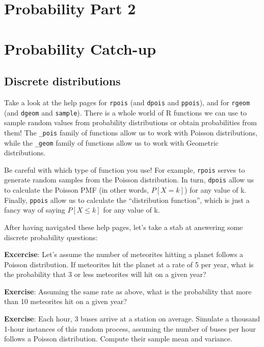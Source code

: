 \documentclass[
]{book}
\begin{document}
\hypertarget{probability-part-2}{%
\chapter{Probability Part 2}\label{probability-part-2}}

\hypertarget{probability-catch-up}{%
\chapter{Probability Catch-up}\label{probability-catch-up}}

\hypertarget{discrete-distributions}{%
\section{Discrete distributions}\label{discrete-distributions}}

Take a look at the help pages for \texttt{rpois} (and \texttt{dpois} and \texttt{ppois}), and for \texttt{rgeom} (and \texttt{dgeom} and \texttt{sample}). There is a whole world of R functions we can use to sample random values from probability distributions or obtain probabilities from them! The \texttt{\_pois} family of functions allow us to work with Poisson distributions, while the \texttt{\_geom} family of functions allow us to work with Geometric distributions.

Be careful with which type of function you use! For example, \texttt{rpois} serves to generate random samples from the Poisson distribution. In turn, \texttt{dpois} allow us to calculate the Poisson PMF (in other words, \(P[X=k]\)) for any value of k. Finally, \texttt{ppois} allow us to calculate the ``distribution function'', which is just a fancy way of saying \(P[X \leq k]\) for any value of k.

After having navigated these help pages, let's take a stab at answering some discrete probability questions:

\textbf{Excercise}: Let's assume the number of meteorites hitting a planet follows a Poisson distribution. If meteorites hit the planet at a rate of 5 per year, what is the probability that 3 or less meteorites will hit on a given year?

\textbf{Exercise}: Assuming the same rate as above, what is the probability that more than 10 meteorites hit on a given year?

\textbf{Exercise}: Each hour, 3 buses arrive at a station on average. Simulate a thousand 1-hour instances of this random process, assuming the number of buses per hour follows a Poisson distribution. Compute their sample mean and variance.
\end{document}
